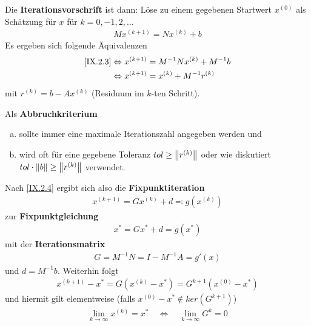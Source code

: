 Die \textbf{Iterationsvorschrift} ist dann: 
Löse zu einem gegebenen Startwert $x^{(0)}$ als Schätzung für $x$
für $k=0,-1,2, \ldots$
\begin{gather}
  Mx^{(k+1)}= Nx^{(k)} +b \label{IX.2.3}
\end{gather}
Es ergeben sich folgende Äquivalenzen
\begin{align}
  \eqref{IX.2.3} &\Leftrightarrow
                   x^{(k+1)} = M^{-1}Nx^{(k)}+M^{-1}b 
                   \label{IX.2.4}\\
                 &\Leftrightarrow x^{(k+1)} = x^{(k)} + M^{-1}r^{(k)}
                   \label{IX.2.5}
\end{align}
mit $r^{(k)}= b-Ax^{(k)}$ (Residuum im $k$-ten Schritt).

Als \textbf{Abbruchkriterium}
\begin{enumerate}[a)]
\item sollte immer eine maximale Iterationszahl angegeben werden und
\item wird oft für eine gegebene Toleranz $tol\geq\nn[r^{(k)}]$
  oder wie diskutiert $tol\cdot \nn[b]\geq \nn[r^{(k)}]$ verwendet.
\end{enumerate}

Nach \eqref{IX.2.4} ergibt sich also die \textbf{Fixpunktiteration}
\begin{gather}
  x^{(k+1)} = Gx^{(k)} +d \eqqcolon g(x^{(k)})
  \label{IX.2.6}
\end{gather}
zur \textbf{Fixpunktgleichung}
\begin{gather*}
  x^{*} = Gx^{*} + d = g(x^{*})
\end{gather*}
mit der \textbf{Iterationsmatrix} 
\begin{gather}
  G=M^{-1}N=I-M^{-1}A = g'(x)
  \label{IX.2.7}
\end{gather}
und $d=M^{-1}b$. Weiterhin folgt
\begin{gather*}
  x^{(k+1)}-x^{*} = G(x^{(k)}-x^{*})=G^{k+1}(x^{(0)}-x^{*})
\end{gather*}
und hiermit gilt elementweise (falls $x^{(0)}-x^{*}\not\in ker
(G^{k+1})$)
\begin{gather*}
  \lim_{k\to\infty} x^{(k)} = x^{*}
  \quad\Leftrightarrow\quad
  \lim_{k\to\infty} G^k =0
\end{gather*}


